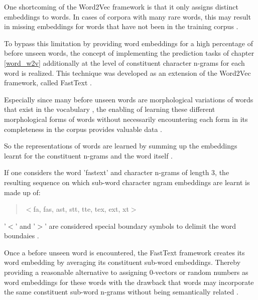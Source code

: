 One shortcoming of the Word2Vec framework is that it only assigns distinct embeddings to words. In cases of corpora with many rare words, this may result in missing embeddings for words that have not been in the training corpus \citep{bojanowski2017enriching}.

To bypass this limitation by providing word embeddings for a high percentage of before unseen words, the concept of implementing the prediction tasks of chapter \ref{word_w2v} additionally at the level of constituent character n-grams for each word is realized. This technique was developed as an extension of the Word2Vec framework, called FastText \citep{bojanowski2017enriching}. 

Especially since many before unseen words are morphological variations of words that exist in the vocabulary \citep{embedding2020pilehvar}, the enabling of learning these different morphological forms of words without necessarily encountering each form in its completeness in the corpus provides valuable data \citep{jain2016fasttext}. 

So the representations of words are learned by summing up the embeddings learnt for the constituent n-grams and the word itself \citep{rehurek2022fasttext}. 

If one considers the word 'fastext' and character n-grams of length 3, the resulting sequence on which sub-word character ngram embeddings are learnt is made up of:

\begin{quote}
    \label{char-n-grams}
    \centering
    $<$fa,  fas,    ast,    stt,    tte,    tex,    ext,    xt$>$
\end{quote}

'$<$' and '$>$' are considered special boundary symbols to delimit the word boundaies \citep{jurafsky2021}.

Once a before unseen word is encountered, the FastText framework creates its word embedding by averaging its constituent sub-word embeddings. Thereby providing a reasonable alternative to assigning 0-vectors or random numbers as word embeddings for these words with the drawback that words may incorporate the same constituent sub-word n-grams without being semantically related \citep{embedding2020pilehvar}.
